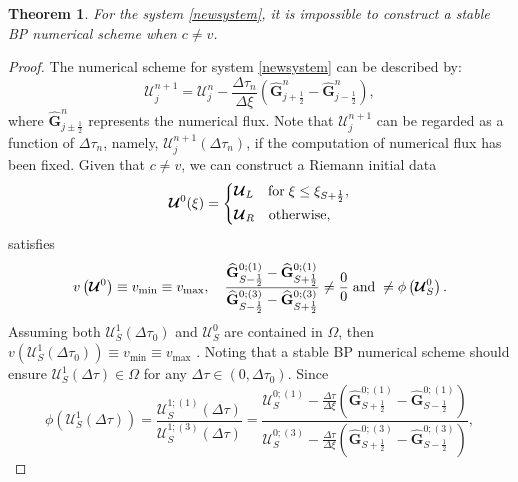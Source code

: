 \documentclass[times,final,11pt]{elsarticle}
\newtheorem{theorem}{Theorem}[section]
\numberwithin{equation}{section}
\theoremstyle{definition}
\theoremstyle{remark}
\begin{document}
\begin{theorem}
\label{infeasible}
	For the system \eqref{newsystem}, it is impossible to construct a stable BP numerical scheme when $c \neq v$.
\end{theorem}
\begin{proof}
	The numerical scheme for system \eqref{newsystem} can be described by:
	\begin{equation*}
		\boldsymbol{\mathcal{U}}_j^{n + 1} = \boldsymbol{\mathcal{U}}_j^n - \frac{\Delta \tau_n}{\Delta \xi} \left( \widehat{\mathbf{G}}_{j + \frac{1}{2}}^n - \widehat{\mathbf{G}}_{j - \frac{1}{2}}^n \right),
	\end{equation*}
	where $\widehat{\mathbf{G}}_{j \pm \frac{1}{2}}^n$ represents the numerical flux. Note that $\boldsymbol{\mathcal{U}}_j^{n + 1}$ can be regarded as a function of $\Delta \tau_n$, namely, $\boldsymbol{\mathcal{U}}_j^{n + 1} (\Delta \tau_n)$, if the computation of numerical flux has been fixed. Given that $c \neq v$, we can construct a Riemann initial data
	\begin{equation*}
		\boldsymbol{\mathcal{U}}^0 (\xi) = \left\{
		\begin{aligned}
			& \boldsymbol{\mathcal{U}}_L \quad {\rm for} \; \xi \leq \xi_{S + \frac{1}{2}}, \\
			& \boldsymbol{\mathcal{U}}_R \quad {\rm otherwise},
		\end{aligned}
		\right.
	\end{equation*}
	satisfies
	\begin{equation}
	\label{90}
		v \left(\boldsymbol{\mathcal{U}}^0 \right) \equiv v_{\min} \equiv v_{\max}, \quad \frac{\widehat{\mathbf{G}}_{S - \frac{1}{2}}^{0;(1)} - \widehat{\mathbf{G}}_{S + \frac{1}{2}}^{0;(1)}}{\widehat{\mathbf{G}}_{S - \frac{1}{2}}^{0;(3)} - \widehat{\mathbf{G}}_{S + \frac{1}{2}}^{0;(3)}} \neq \frac{0}{0} \; {\rm and} \; \neq \phi \left( \boldsymbol{\mathcal{U}}_S^{0} \right). 
	\end{equation}
	Assuming both $\boldsymbol{\mathcal{U}}_S^{1}(\Delta \tau_0)$ and $\boldsymbol{\mathcal{U}}_S^{0}$ are contained in $\Omega$, then $v \left(\boldsymbol{\mathcal{U}}_S^{1}(\Delta \tau_0) \right) \equiv v_{\min} \equiv v_{\max}$ . Noting that a stable BP numerical scheme should ensure $\boldsymbol{\mathcal{U}}_S^{1}(\Delta \tau) \in \Omega$ for any $\Delta \tau \in (0, \Delta \tau_0)$. Since
	\begin{equation*}
		\phi \left( \boldsymbol{\mathcal{U}}_S^{1}(\Delta \tau) \right) = \frac{\boldsymbol{\mathcal{U}}_S^{1;(1)}(\Delta \tau)}{\boldsymbol{\mathcal{U}}_S^{1;(3)}(\Delta \tau)} = \frac{\boldsymbol{\mathcal{U}}_S^{0;(1)} - \frac{\Delta \tau}{\Delta \xi} \left( \widehat{\mathbf{G}}_{S + \frac{1}{2}}^{0;(1)} - \widehat{\mathbf{G}}_{S - \frac{1}{2}}^{0;(1)} \right)}{\boldsymbol{\mathcal{U}}_S^{0;(3)} - \frac{\Delta \tau}{\Delta \xi} \left( \widehat{\mathbf{G}}_{S + \frac{1}{2}}^{0;(3)} - \widehat{\mathbf{G}}_{S - \frac{1}{2}}^{0;(3)} \right)},

\end{equation*}
\end{proof}
\end{document}

